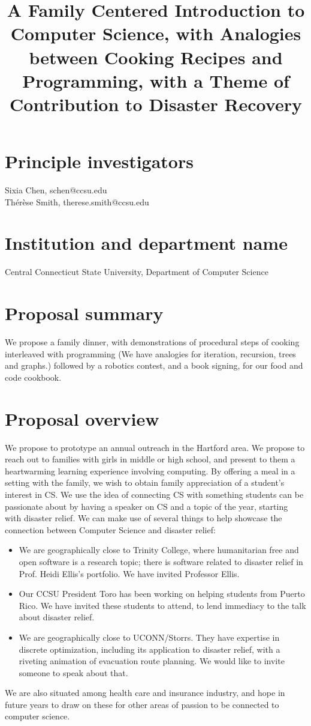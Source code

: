 \documentclass[]{article}
\title{A Family Centered Introduction to Computer Science, with Analogies between Cooking Recipes  
and Programming, with a Theme of Contribution to Disaster Recovery}
\author{}
\begin{document}
\maketitle

 

 

\section{Principle investigators}
Sixia Chen, schen@ccsu.edu\\
Th\'er\`ese Smith, therese.smith@ccsu.edu

\section{Institution and department name}
Central Connecticut State University, Department of Computer Science

\section{Proposal summary}
We propose a family dinner, with demonstrations of procedural steps of cooking interleaved with programming 
(We have analogies for iteration, recursion, trees and graphs.) followed by a robotics contest, and a book signing, 
for our food and code cookbook.


\section{Proposal overview}
We propose to prototype an annual outreach in the Hartford area.
We propose to reach out to families with girls in middle or high school, and present to them a heartwarming learning experience involving computing. By offering a meal in a setting with the family, we wish to obtain family appreciation of a student's interest in
 CS.
We use the idea of connecting CS with something students can be passionate about by having a speaker on CS and a topic of the 
year, starting with disaster relief. 
We can make use of several things to help showcase the connection between Computer Science and disaster relief:
\begin{itemize}
\item We are geographically close to Trinity College, where humanitarian free and open software is a research topic; there is 
software related to disaster relief in Prof. Heidi Ellis's portfolio. We have invited Professor Ellis. 
\item Our CCSU President Toro has been working on helping students from Puerto Rico. We have invited these students to attend, 
to lend immediacy to the talk about disaster relief.  
\item We are geographically close to UCONN/Storrs. They have expertise in discrete optimization, including its application to 
disaster relief, with a riveting animation of evacuation route planning. We would like to invite someone to speak about that.
\end{itemize}
We are also situated among health care and insurance industry, and hope in future years to draw on these for other areas of 
passion to be connected to computer science.
\end{document}
